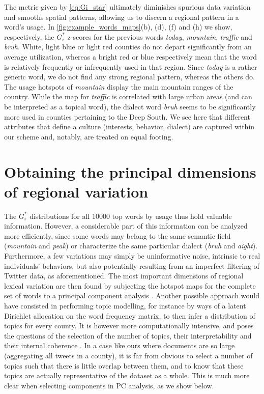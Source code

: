 \documentclass[../thesis.tex]{subfiles}
\begin{document}
The metric given by \cref{eq:Gi_star} ultimately diminishes spurious data variation and
smooths spatial patterns, allowing us to discern a regional pattern in a word's usage.
In \cref{fig:example_words_maps}(b), (d), (f) and (h) we show, respectively, the $G_i^*$
z-scores for the previous words \textit{today}, \textit{mountain}, \textit{traffic} and
\textit{bruh}. White, light blue or light red counties do not depart significantly from
an average utilization, whereas a bright red or blue respectively mean that the word is
relatively frequently or infrequently used in that region. Since \textit{today} is a
rather generic word, we do not find any strong regional pattern, whereas the others do.
The usage hotspots of \textit{mountain} display the main mountain ranges of the country.
While the map for \textit{traffic} is correlated with large urban areas (and can be
interpreted as a topical word), the dialect word \textit{bruh} seems to be significantly
more used in counties pertaining to the Deep South. We see here that different
attributes that define a culture (interests, behavior, dialect) are captured within our
scheme and, notably, are treated on equal footing.


\section{Obtaining the principal dimensions of regional variation}

The $G_i^*$ distributions for all \SI{10000}{} top words by usage thus hold valuable
information. However, a considerable part of this information can be analyzed more
efficiently, since some words may belong to the same semantic field (\textit{mountain}
and \textit{peak}) or characterize the same particular dialect (\textit{bruh} and
\textit{aight}). Furthermore, a few variations may simply be uninformative noise,
intrinsic to real individuals' behaviors, but also potentially resulting from an
imperfect filtering of Twitter data, as aforementioned. The most important dimensions of
regional lexical variation are then found by subjecting the hotspot maps for the
complete set of words to a principal component analysis
\cite{LieskeRegionalSubcultures1993,WoldPrincipalComponent1987}. Another possible
approach would have consisted in performing topic modelling, for instance by ways of a
latent Dirichlet allocation on the word frequency matrix, to then infer a distribution
of topics for every county. It is however more computationally intensive, and poses the
questions of the selection of the number of topics, their interpretability and their
internal coherence \cite{ArunFindingNatural2010,HasanNormalizedApproach2021}. In a case
like ours where documents are so large (aggregating all tweets in a county), it is far
from obvious to select a number of topics such that there is little overlap between
them, and to know that these topics are actually representative of the dataset as a
whole. This is much more clear when selecting components in \ac{PC} analysis, as we show
below.
\end{document}
